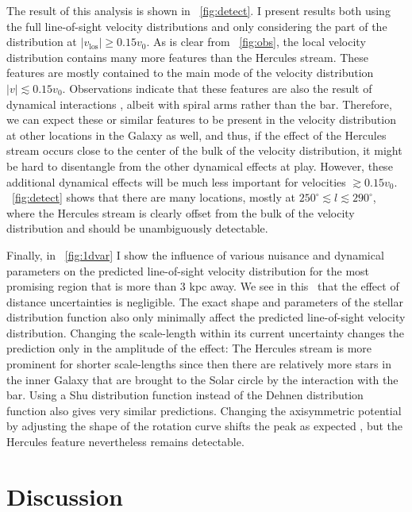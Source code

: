 \documentclass[12pt,preprint]{aastex}
\newcommand{\eg}{e.g.}
\newcommand{\vo}{\ensuremath{v_0}}
\begin{document}
The result of this analysis is shown in
\figurename~\ref{fig:detect}. I present results both using the full
line-of-sight velocity distributions and only considering the part of
the distribution at $|v_{\text{los}}| \geq 0.15 \vo$. As is clear from
\figurename~\ref{fig:obs}, the local velocity distribution contains
many more features than the Hercules stream. These features are mostly
contained to the main mode of the velocity distribution $|v| \lesssim
0.15 \vo$. Observations indicate that these features are also the
result of dynamical interactions \citep[\eg,][]{Bovy10a,sellwood10a},
albeit with spiral arms rather than the bar. Therefore, we can expect
these or similar features to be present in the velocity distribution
at other locations in the Galaxy as well, and thus, if the effect of
the Hercules stream occurs close to the center of the bulk of the
velocity distribution, it might be hard to disentangle from the other
dynamical effects at play. However, these additional dynamical effects
will be much less important for velocities $\gtrsim 0.15
\vo$. \figurename~\ref{fig:detect} shows that there are many
locations, mostly at $250^{\circ} \lesssim l \lesssim 290^{\circ}$,
where the Hercules stream is clearly offset from the bulk of the
velocity distribution and should be unambiguously detectable.

Finally, in \figurename~\ref{fig:1dvar} I show the influence of
various nuisance and dynamical parameters on the predicted
line-of-sight velocity distribution for the most promising region that
is more than 3 kpc away. We see in this \figurename\ that the effect
of distance uncertainties is negligible. The exact shape and
parameters of the stellar distribution function also only minimally
affect the predicted line-of-sight velocity distribution. Changing the
scale-length within its current uncertainty changes the prediction
only in the amplitude of the effect: The Hercules stream is more
prominent for shorter scale-lengths since then there are relatively
more stars in the inner Galaxy that are brought to the Solar circle by
the interaction with the bar. Using a Shu distribution function
\citep{shu69a} instead of the Dehnen distribution function also gives
very similar predictions. Changing the axisymmetric potential by
adjusting the shape of the rotation curve shifts the peak as expected
\citep[see][]{dehnen00a}, but the Hercules feature nevertheless
remains detectable.



\section{Discussion}
\end{document}
